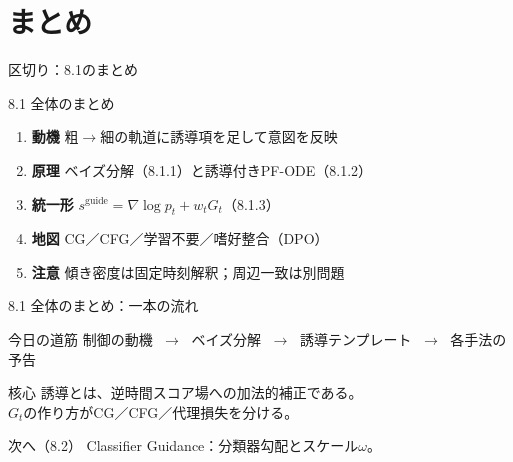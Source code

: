 \section{まとめ}
\asmain
\begin{frame}{区切り：8.1のまとめ}
    \tableofcontents[currentsection]
\end{frame}
\asmain
\begin{frame}{8.1 全体のまとめ}
    \begin{enumerate}
        \item \textbf{動機}
        粗$\to$細の軌道に誘導項を足して意図を反映
        \item \textbf{原理}
        ベイズ分解（8.1.1）と誘導付きPF-ODE（8.1.2）
        \item \textbf{統一形}
        $s^{\mathrm{guide}}=\nabla\log p_t+w_t G_t$（8.1.3）
        \item \textbf{地図}
        CG／CFG／学習不要／嗜好整合（DPO）
        \item \textbf{注意}
        傾き密度は固定時刻解釈；周辺一致は別問題
    \end{enumerate}
\end{frame}
\asmain
\begin{frame}{8.1 全体のまとめ：一本の流れ}
    \begin{block}{今日の道筋}
        制御の動機
        $\;\to\;$
        ベイズ分解
        $\;\to\;$
        誘導テンプレート
        $\;\to\;$
        各手法の予告
    \end{block}
    \begin{block}{核心}
        誘導とは、逆時間スコア場への加法的補正である。\\
        $G_t$の作り方がCG／CFG／代理損失を分ける。
    \end{block}
    \begin{block}{次へ（8.2）}
        Classifier Guidance：分類器勾配とスケール$\omega$。
    \end{block}
\end{frame}
